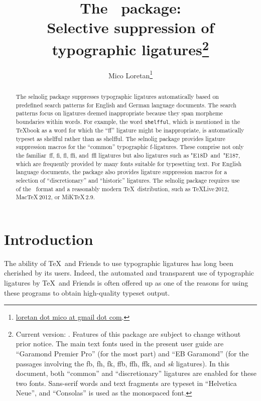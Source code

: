 \documentclass[12pt]{article}
\title{The \selnoligpackagename\ package: \\
Selective suppression of typographic ligatures\thanks{
Current version: \selnoligpackageversion. Features of this package are subject to change without prior notice. The main text fonts used in the present user guide are \enquote{Garamond Premier Pro} (for the most part) and \enquote{EB Garamond} (for the passages involving the \bgroup\ebg \mbox{fb}, \mbox{fh}, \mbox{fk}, \mbox{ffb}, \mbox{ffh},  \mbox{ffk}, and \emph{\mbox{sk}} ligatures\egroup). In this document, both \enquote{common} and \enquote{discretionary} ligatures are enabled for these two fonts. Sans-serif words and text fragments are typeset in \enquote{Helvetica Neue}, and \enquote{Consolas} is used as the monospaced font.}}
\author{Mico Loretan\thanks{
\href{mailto:loretan.mico@gmail.com}{loretan dot mico at gmail dot com}.}}
\date{\selnoligpackagedate}
\newcommand{\pkg}[1]{\textsf{#1}}
\newcommand{\opt}[1]{\texttt{#1}}
\begin{document}
\VerbatimFootnotes
{}

\maketitle


\begin{abstract}

The \pkg{selnolig} package suppresses typographic ligatures automatically based on pre\-defined search patterns for English and German language documents. The search patterns focus on ligatures deemed inappropriate because they span morpheme boundaries within words. For example, the word \opt{shelfful}, which is mentioned in the \TeX book as a word for which the \enquote{ff} ligature might be inappropriate, is automatically typeset as shelfful rather than as shel\mbox{ff}ul.
\newline\hspace*{\parindent}
The \pkg{selnolig} package provides ligature suppression macros  for the \enquote{common} typographic f-ligatures. These comprise not only the familiar~ff, fi, fl, ffi, and~ffl ligatures but also ligatures such as \char"E18D\ and~\char"E187, which are frequently provided by many fonts suitable for typesetting text.
\newline\hspace*{\parindent}
For English language documents, the package also provides ligature suppression macros for a selection of  \enquote{discretionary} and \enquote{historic} ligatures.
\newline\hspace*{\parindent}
The \pkg{selnolig} package requires use of the \LuaLaTeX\ format and a reasonably modern \TeX\ distribution, such as \TeX Live\,2012, Mac\TeX\,2012, or MiK\TeX\,2.9.
\end{abstract}


\enlargethispage{1.8\baselineskip}
\tableofcontents

\clearpage
{}
\section{Introduction}

The ability of \TeX\ and Friends to use typographic ligatures has long been cherished by its users. Indeed, the automated and transparent use of typographic ligatures by \TeX\ and Friends is often offered up as one of the reasons for using these programs to obtain high-quality typeset output.
\end{document}
